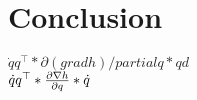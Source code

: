\documentclass[main.tex]{subfiles}
\begin{document}
\chapter{Conclusion}
$\dot qq^\top * \partial (grad h)/partial q * qd$\\
$\dot qq^\top * \pdv{\nabla h}{q} * \dot q$
\end{document}
